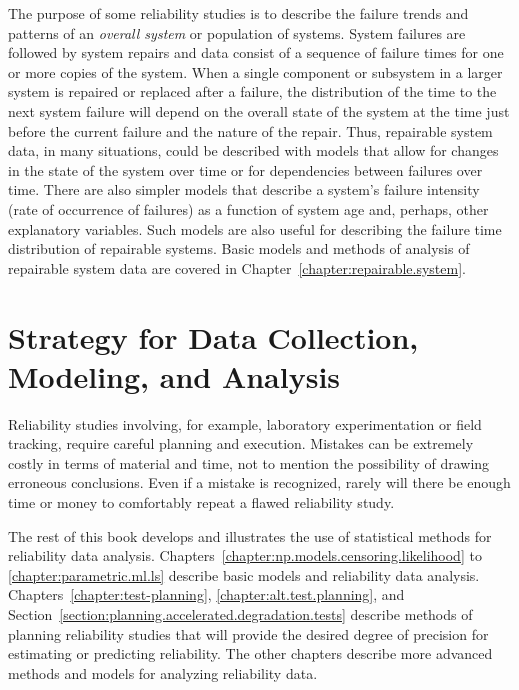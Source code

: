 The purpose of some reliability studies is to describe the failure
trends and patterns of an {\em overall system} or population of
systems.  System failures are followed by system repairs and data
consist of a sequence of failure times for one or more copies of the
system.  When a single component or subsystem in a larger system is
repaired or replaced after a failure, the distribution of the time to
the next system failure will depend on the overall state of the system
at the time just before the current failure and the nature of the
repair.  Thus, repairable system data, in many situations, could be
described with models that allow for changes in the state of the
system over time or for dependencies between failures over time.
There are also simpler models that describe a system's failure
intensity (rate of occurrence of failures) as a function of system age
and, perhaps, other explanatory variables.  Such models are also
useful for describing the failure time distribution of repairable
systems. Basic models and methods of analysis of repairable system
data are covered in Chapter~\ref{chapter:repairable.system}.



\section{Strategy for Data Collection, Modeling, and Analysis}
\label{section:strategy.intro}
Reliability studies involving, for example, laboratory experimentation or
field tracking, require careful planning and execution.  Mistakes can
be extremely costly in terms of material and time, not to mention the
possibility of drawing erroneous conclusions. Even if a mistake is
recognized, rarely will there be enough time or money to comfortably
repeat a flawed reliability study.

The rest of this book develops and illustrates the use of statistical
methods for reliability data analysis.
Chapters~\ref{chapter:np.models.censoring.likelihood} to
\ref{chapter:parametric.ml.ls} describe basic models and
reliability data analysis. Chapters~\ref{chapter:test-planning},
\ref{chapter:alt.test.planning},
and Section~\ref{section:planning.accelerated.degradation.tests}
describe methods of planning reliability studies that will provide the
desired degree of precision for estimating or predicting reliability.
The other chapters describe more advanced methods and models for
analyzing reliability data.

